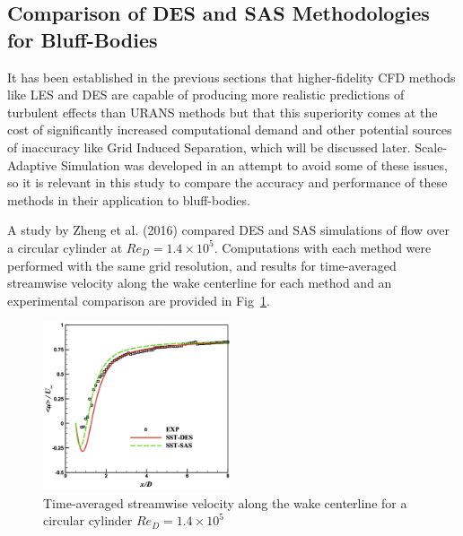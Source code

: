\documentclass[journal]{new-aiaa}
\begin{document}
\subsection{Comparison of DES and SAS Methodologies for Bluff-Bodies} \label{subsec:desvssas}

It has been established in the previous sections that higher-fidelity CFD methods like LES and DES are capable of producing more realistic predictions of turbulent effects than URANS methods but that this superiority comes at the cost of significantly increased computational demand and other potential sources of inaccuracy like Grid Induced Separation, which will be discussed later. Scale-Adaptive Simulation was developed in an attempt to avoid some of these issues, so it is relevant in this study to compare the accuracy and performance of these methods in their application to bluff-bodies.

A study by Zheng et al. (2016) \cite{zheng2016comparative} compared DES and SAS simulations of flow over a circular cylinder at $Re_D = 1.4 \times 10^5$. Computations with each method were performed with the same grid resolution, and results for time-averaged streamwise velocity along the wake centerline for each method and an experimental comparison are provided in Fig~\ref{fig:cylinderdesvssas}.

\begin{figure}[H]
\begin{center}
\includegraphics[width=0.49\textwidth]{Images/logan/zheng2016comparative_WakeVelocity.pdf}
\caption{ Time-averaged streamwise velocity along the wake centerline for a circular cylinder $Re_D = 1.4 \times 10^5$ \cite{zheng2016comparative} }
\label{fig:cylinderdesvssas}
\end{center}
\end{figure}
\end{document}
